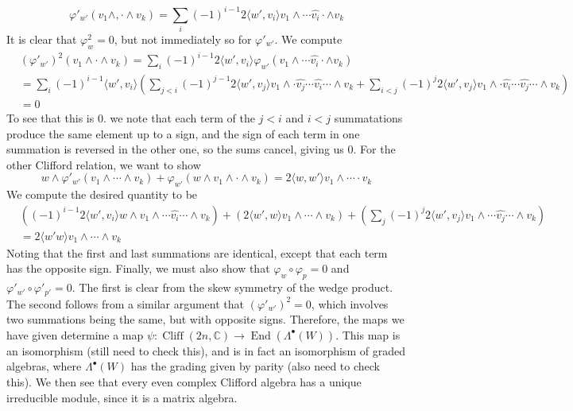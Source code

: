 \documentclass[psamsfonts]{amsart}
\theoremstyle{definition}
\theoremstyle{remark}
\newcommand{\C}{\mathbb{C}}
\DeclareMathOperator{\End}{End}
\DeclareMathOperator{\Cliff}{Cliff}
\begin{document}
\[
\varphi'_{w'}(v_1 \wedge, \cdot \wedge v_k) = \sum_i (-1)^{i-1} 2\langle w', v_i \rangle v_1 \wedge \cdots \hat{v_i} \cdot \wedge v_k
\]
It is clear that $\varphi_w^2 = 0$, but not immediately so for $\varphi'_{w'}$. We compute
%
\begin{align*}
&(\varphi'_{w'})^2(v_1 \wedge \cdot \wedge v_k) = \sum_i (-1)^{i-1} 2\langle w', v_i \rangle \varphi_{w'}(v_1 \wedge \cdots \hat{v_i} \cdot \wedge v_k) \\
&= \sum_i (-1)^{i-1} \langle w', v_i \rangle \left( \sum_{j < i} (-1)^{j-1} 2\langle w', v_j \rangle v_1 \wedge \cdot \hat{v_j} \cdots \hat{v_i} \cdots \wedge v_k + \sum_{i < j} (-1)^{j} 2\langle w', v_j \rangle v_1 \wedge \cdot \hat{v_i} \cdots \hat{v_j} \cdots \wedge v_k  \right) \\
&= 0
\end{align*}
To see that this is $0$. we note that each term of the $j < i$ and $i < j$ summatations produce the same element up to a sign, and the sign of each term in one summation is reversed in the other one, so the sums cancel, giving us $0$. For the other Clifford relation, we want to show 
\[
w \wedge \varphi'_{w'}(v_1 \wedge \cdots \wedge v_k) + \varphi_{w'}(w \wedge v_1 \wedge \cdot \wedge v_k) = 2\langle w, w' \rangle v_1 \wedge \cdots \cdot v_k
\]
We compute the desired quantity to be
\begin{align*}
&\left( (-1)^{i-1} 2\langle w', v_i \rangle w \wedge v_1 \wedge \cdots \hat{v_i} \cdots \wedge v_k \right) + \left( 2\langle w', w \rangle v_1 \wedge \cdots \wedge v_k \right) + \left( \sum_j (-1)^j 2\langle w', v_j \rangle v_1 \wedge \cdots \hat{v_j} \cdots \wedge v_k  \right) \\
&= 2\langle w' w \rangle v_1 \wedge \cdots \wedge v_k
\end{align*}
Noting that the first and last summations are identical, except that each term has the opposite sign. Finally, we must also show that $\varphi_w \circ \varphi_p = 0$ and $\varphi'_{w'} \circ \varphi'_{p'} = 0$. The first is clear from the skew symmetry of the wedge product. The second follows from a similar argument that $(\varphi'_{w'})^2 = 0$, which involves two summations being the same, but with opposite signs. Therefore, the maps we have given determine a map $\psi : \Cliff(2n, \C) \to \End(\Lambda^\bullet(W))$. This map is an isomorphism (still need to check this), and is in fact an isomorphism of graded algebras, where $\Lambda^\bullet(W)$ has the grading given by parity (also need to check this). We then see that every even complex Clifford algebra has a unique irreducible module, since it is a matrix algebra. \\
\end{document}
